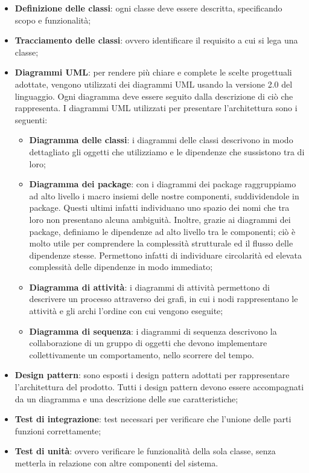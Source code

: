 				\begin{itemize}
					\item \textbf{Definizione delle classi}: ogni classe deve essere descritta, specificando scopo e funzionalità;
					\item \textbf{Tracciamento delle classi}: ovvero identificare il requisito a cui si lega una classe;
					\item \textbf{Diagrammi UML}: per rendere più chiare e complete le scelte progettuali adottate, vengono utilizzati dei diagrammi UML usando la
versione 2.0 del linguaggio. Ogni diagramma deve essere seguito dalla
descrizione di ciò che rappresenta. I diagrammi UML utilizzati per presentare l'architettura sono i seguenti:
					\begin{itemize}
					\item \textbf{Diagramma delle classi}: i diagrammi delle classi descrivono in modo dettagliato gli oggetti che utilizziamo e le dipendenze che sussistono tra di loro;
					\item \textbf{Diagramma dei package}: con i diagrammi dei package raggruppiamo ad alto livello i macro insiemi delle nostre componenti, suddividendole in package. Questi ultimi infatti individuano uno spazio dei nomi che tra loro non presentano alcuna ambiguità. Inoltre, grazie ai diagrammi dei package, definiamo le dipendenze ad alto livello tra le componenti; ciò è molto utile per comprendere la complessità strutturale ed il flusso delle dipendenze stesse. Permettono infatti di individuare circolarità ed elevata complessità delle dipendenze in modo immediato;
					\item \textbf{Diagramma di attività}: i diagrammi di attività permettono di descrivere un processo attraverso dei grafi, in cui i nodi rappresentano le attività e gli archi l'ordine con cui vengono eseguite;
					\item \textbf{Diagramma di sequenza}: i diagrammi di sequenza descrivono la collaborazione di un gruppo di oggetti che devono implementare collettivamente un comportamento, nello scorrere del tempo.
				\end{itemize}
					\item \textbf{Design pattern}\glo : sono esposti i design pattern adottati per rappresentare l'architettura del prodotto. Tutti i design pattern devono essere accompagnati da un diagramma e una descrizione delle sue caratteristiche;
					\item \textbf{Test di integrazione}: test necessari per verificare che l’unione delle parti funzioni correttamente;
					\item \textbf{Test di unità}: ovvero verificare le funzionalità della sola classe, senza metterla in relazione con altre componenti del sistema.
				\end{itemize}
